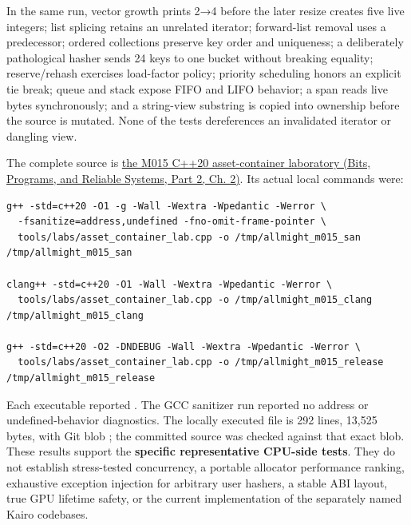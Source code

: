 In the same run, vector growth prints 2→4 before the later resize creates five live integers; list splicing retains an unrelated iterator; forward-list removal uses a predecessor; ordered collections preserve key order and uniqueness; a deliberately pathological hasher sends 24 keys to one bucket without breaking equality; reserve/rehash exercises load-factor policy; priority scheduling honors an explicit tie break; queue and stack expose FIFO and LIFO behavior; a span reads live bytes synchronously; and a string-view substring is copied into ownership before the source is mutated. None of the tests dereferences an invalidated iterator or dangling view.

The complete source is \href{../01-Bits-Programs-and-Reliable-Systems-P02/main.pdf\#nameddest=source-file-e829cf731b17419e282775cf}{the M015 C++20 asset-container laboratory (Bits, Programs, and Reliable Systems, Part 2, Ch. 2)}. Its actual local commands were:

\begin{verbatim}
g++ -std=c++20 -O1 -g -Wall -Wextra -Wpedantic -Werror \
  -fsanitize=address,undefined -fno-omit-frame-pointer \
  tools/labs/asset_container_lab.cpp -o /tmp/allmight_m015_san
/tmp/allmight_m015_san

clang++ -std=c++20 -O1 -Wall -Wextra -Wpedantic -Werror \
  tools/labs/asset_container_lab.cpp -o /tmp/allmight_m015_clang
/tmp/allmight_m015_clang

g++ -std=c++20 -O2 -DNDEBUG -Wall -Wextra -Wpedantic -Werror \
  tools/labs/asset_container_lab.cpp -o /tmp/allmight_m015_release
/tmp/allmight_m015_release
\end{verbatim}

Each executable reported . The GCC sanitizer run reported no address or undefined-behavior diagnostics. The locally executed file is 292 lines, 13,525 bytes, with Git blob ; the committed source was checked against that exact blob. These results support the \textbf{specific representative CPU-side tests}. They do not establish stress-tested concurrency, a portable allocator performance ranking, exhaustive exception injection for arbitrary user hashers, a stable ABI layout, true GPU lifetime safety, or the current implementation of the separately named Kairo codebases.

